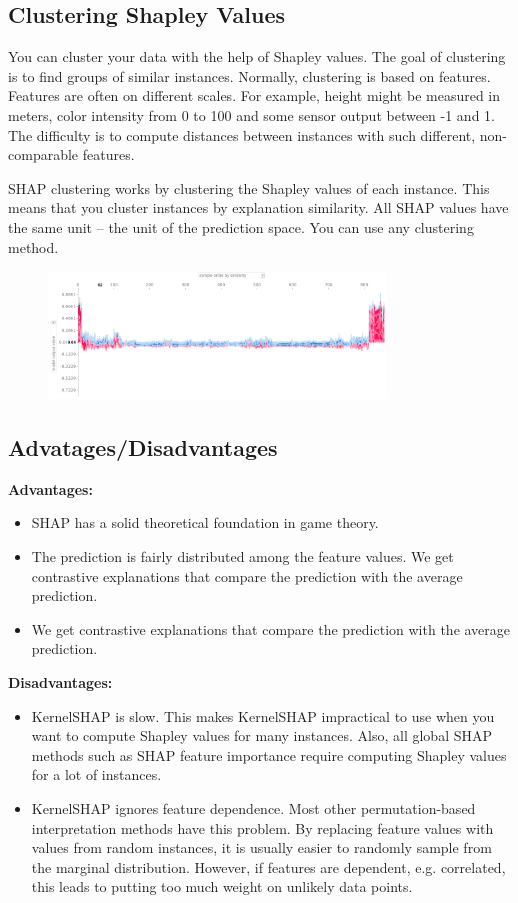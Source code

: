 \subsection{Clustering Shapley Values}
You can cluster your data with the help of Shapley values. The goal of clustering is to find groups of similar instances. Normally, clustering is based on features. Features are often on different scales. For example, height might be measured in meters, color intensity from 0 to 100 and some sensor output between -1 and 1. The difficulty is to compute distances between instances with such different, non-comparable features.

SHAP clustering works by clustering the Shapley values of each instance. This means that you cluster instances by explanation similarity.
All SHAP values have the same unit – the unit of the prediction space. You can use any clustering method.
\begin{figure}[H]
    \includegraphics[width=0.8\textwidth]{img/shap-clustering.png}
    \centering
\end{figure}

\subsection{Advatages/Disadvantages}
\textbf{Advantages:}\\
\begin{itemize}
    \item SHAP has a solid theoretical foundation in game theory.
    \item The prediction is fairly distributed among the feature values. We get contrastive explanations that compare the prediction with the average prediction.
    \item We get contrastive explanations that compare the prediction with the average prediction.
\end{itemize}
\textbf{Disadvantages:}\\
\begin{itemize}
    \item KernelSHAP is slow. This makes KernelSHAP impractical to use when you want to compute Shapley values for many instances. Also, all global SHAP methods such as SHAP feature importance require computing Shapley values for a lot of instances.
    \item KernelSHAP ignores feature dependence. Most other permutation-based interpretation methods have this problem. By replacing feature values
    with values from random instances, it is usually easier to randomly sample from the marginal
    distribution. However, if features are dependent, e.g. correlated, this leads to putting too much weight
    on unlikely data points.
\end{itemize}
